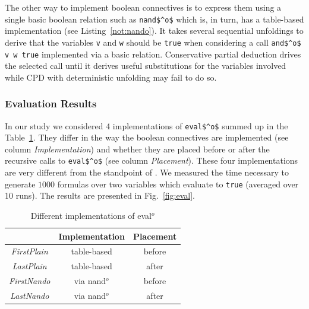 The other way to implement boolean connectives is to express them using a single basic boolean relation such as \lstinline{nand$^o$} which is, in turn, has a table-based
implementation (see Listing~\ref{not:nando}). It takes several sequential unfoldings to derive that the variables \lstinline{v} and \lstinline{w} should
be \lstinline{true} when considering a call \lstinline{and$^o$ v w true} implemented via a basic relation.
Conservative partial deduction drives the selected call until it derives useful substitutions for the variables involved while CPD with deterministic unfolding may fail to do so.


\subsubsection{Evaluation Results}

In our study we considered 4 implementations of \lstinline{eval$^o$} summed up in the Table~\ref{tbl:eval}. They differ in the way the boolean connectives are implemented (see column \emph{Implementation}) and whether they are placed before or after the recursive calls to \lstinline{eval$^o$} (see column \emph{Placement}).
These four implementations are very different from the  standpoint of \ecce.
We measured the time necessary to generate $1000$ formulas over two variables which evaluate to \lstinline{true} (averaged over 10 runs).
The results are presented in Fig.~\ref{fig:eval}.

\begin{table}[!h]
    \centering
    \begin{tabular}{c||c||c}
                      & Implementation & Placement \\ \hline\hline
    \emph{FirstPlain} & table-based    & before \\ \hline
    \emph{LastPlain}  & table-based    & after  \\ \hline
    \emph{FirstNando} & via nand$^o$   & before \\ \hline
    \emph{LastNando}  & via nand$^o$   & after  \\
    \end{tabular}

  \caption{Different implementations of eval$^o$}
  \label{tbl:eval}
\end{table}

